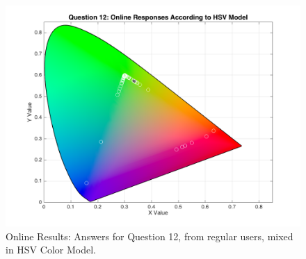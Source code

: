 \begin{figure}[htbp]
\begin{minipage}{0.48\textwidth}
    \includegraphics[width=\textwidth]{images/results/12_online_HSVresponses.png}
    \caption[Online Results: Answers for Question 12, from regular users, mixed in HSV Color Model.]{Online Results: Answers for Question 12, from regular users, mixed in HSV Color Model.}
    \label{fig:onlinehsvregular_12}
  \end{minipage}
\end{figure}
%
